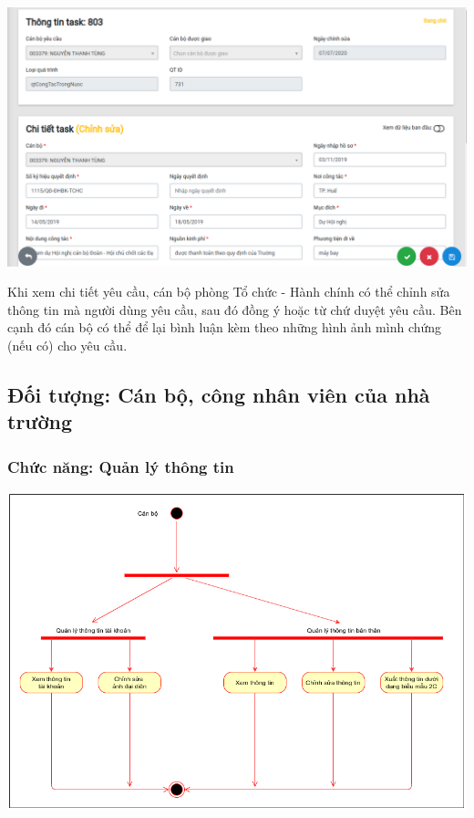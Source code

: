 \begin{center}
  \captionsetup{type=figure}
  \includegraphics[width=15cm]{img/Screen/chitiettask.png}
\end{center}
Khi xem chi tiết yêu cầu, cán bộ phòng Tổ chức - Hành chính có thể chỉnh sửa thông tin mà người dùng yêu cầu, sau đó đồng ý hoặc từ chứ duyệt yêu cầu. Bên cạnh đó cán bộ có thể để lại bình luận kèm theo những hình ảnh mình chứng (nếu có) cho yêu cầu.\\
\subsection{Đối tượng: Cán bộ, công nhân viên của nhà trường}
\subsubsection{Chức năng: Quản lý thông tin}
\begin{center}
  \captionsetup{type=figure}
  \includegraphics[width=15cm]{img/UML/User/activityQLThongTin.png}
\end{center}
